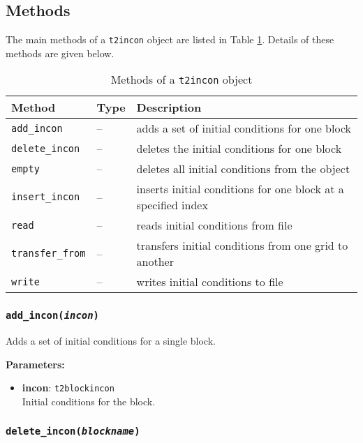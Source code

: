 \subsection{Methods}

The main methods of a \texttt{t2incon} object are listed in Table \ref{tb:t2incon_methods}.  Details of these methods are given below.

\begin{table}
  \begin{center}
    \begin{tabular}{|l|l|p{65mm}|}
      \hline
      \textbf{Method} & \textbf{Type} & \textbf{Description}\\
      \hline
      \texttt{add\_incon} & -- & adds a set of initial conditions for one block\\
      \texttt{delete\_incon} & -- & deletes the initial conditions for one block\\
      \texttt{empty} & -- & deletes all initial conditions from the object\\
      \texttt{insert\_incon} & -- & inserts initial conditions for one block at a specified index\\
      \texttt{read} & -- & reads initial conditions from file\\
      \texttt{transfer\_from} & -- & transfers initial conditions from one grid to another\\
      \texttt{write} & -- & writes initial conditions to file\\
      \hline
    \end{tabular}
    \caption{Methods of a \texttt{t2incon} object}
    \label{tb:t2incon_methods}
  \end{center}
\end{table}

\subsubsection{\texttt{add\_incon(\emph{incon})}}

Adds a set of initial conditions for a single block.

\textbf{Parameters:}
\begin{itemize}
\item \textbf{incon}: \texttt{t2blockincon}\\
  Initial conditions for the block.
\end{itemize}

\subsubsection{\texttt{delete\_incon(\emph{blockname})}}

